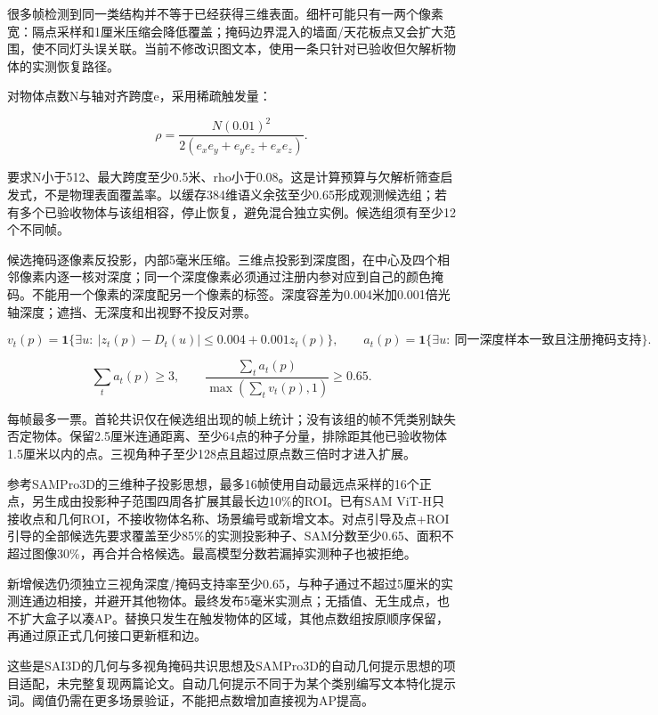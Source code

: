\documentclass[UTF8,fontset=fandol]{ctexart}
\begin{document}
很多帧检测到同一类结构并不等于已经获得三维表面。细杆可能只有一两个像素宽：隔点采样和1厘米压缩会降低覆盖；掩码边界混入的墙面/天花板点又会扩大范围，使不同灯头误关联。当前不修改识图文本，使用一条只针对已验收但欠解析物体的实测恢复路径。



对物体点数N与轴对齐跨度e，采用稀疏触发量：



\[
\rho=\frac{N(0.01)^2}{2(e_xe_y+e_ye_z+e_xe_z)}.
\]

要求N小于512、最大跨度至少0.5米、rho小于0.08。这是计算预算与欠解析筛查启发式，不是物理表面覆盖率。以缓存384维语义余弦至少0.65形成观测候选组；若有多个已验收物体与该组相容，停止恢复，避免混合独立实例。候选组须有至少12个不同帧。



候选掩码逐像素反投影，内部5毫米压缩。三维点投影到深度图，在中心及四个相邻像素内逐一核对深度；同一个深度像素必须通过注册内参对应到自己的颜色掩码。不能用一个像素的深度配另一个像素的标签。深度容差为0.004米加0.001倍光轴深度；遮挡、无深度和出视野不投反对票。



\[
v_t(p)=\mathbf1\{\exists u:\ |z_t(p)-D_t(u)|\le0.004+0.001z_t(p)\},
\qquad a_t(p)=\mathbf1\{\exists u:\ \text{同一深度样本一致且注册掩码支持}\}.
\]

\[
\sum_t a_t(p)\ge3,\qquad
\frac{\sum_ta_t(p)}{\max(\sum_tv_t(p),1)}\ge0.65.
\]

每帧最多一票。首轮共识仅在候选组出现的帧上统计；没有该组的帧不凭类别缺失否定物体。保留2.5厘米连通距离、至少64点的种子分量，排除距其他已验收物体1.5厘米以内的点。三视角种子至少128点且超过原点数三倍时才进入扩展。



参考SAMPro3D的三维种子投影思想，最多16帧使用自动最远点采样的16个正点，另生成由投影种子范围四周各扩展其最长边10\%的ROI。已有SAM ViT-H只接收点和几何ROI，不接收物体名称、场景编号或新增文本。对点引导及点+ROI引导的全部候选先要求覆盖至少85\%的实测投影种子、SAM分数至少0.65、面积不超过图像30\%，再合并合格候选。最高模型分数若漏掉实测种子也被拒绝。



新增候选仍须独立三视角深度/掩码支持率至少0.65，与种子通过不超过5厘米的实测连通边相接，并避开其他物体。最终发布5毫米实测点；无插值、无生成点，也不扩大盒子以凑AP。替换只发生在触发物体的区域，其他点数组按原顺序保留，再通过原正式几何接口更新框和边。



这些是SAI3D的几何与多视角掩码共识思想及SAMPro3D的自动几何提示思想的项目适配，未完整复现两篇论文。自动几何提示不同于为某个类别编写文本特化提示词。阈值仍需在更多场景验证，不能把点数增加直接视为AP提高。
\end{document}
